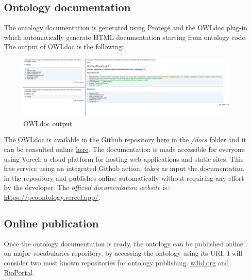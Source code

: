 \subsection{Ontology documentation}
The ontology documentation is generated using Protegé and the OWLdoc plug-in which automatically generate HTML documentation starting from ontology code. The output of OWLdoc is the following:
\begin{figure}[H]
    \centering
    \includegraphics[width=0.9\linewidth]{Figures/fig_63.png}
    \caption{OWLdoc output}
    \label{fig:enter-label}
\end{figure}
The OWLdoc is available in the Github repository \href{https://github.com/simonegramegna/peo/tree/main/docs}{here} in the \textit{/docs} folder and it can be consulted online \href{https://peoontology.vercel.app/}{here}. The documentation is made accessible for everyone using Vercel: a cloud platform for hosting web applications and static sites. This free service using an integrated Github action, takes as input the documentation in the repository and publishes online automatically without requiring any effort by the developer. The \textit{official documentation website} is:
\href{https://peoontology.vercel.app/}{https://peoontology.vercel.app/}.

\subsection{Online publication}
Once the ontology documentation is ready, the ontology can be published online on major vocabularies repository, by accessing the ontology using its URI. I will consider two most known repositories for ontology publishing: \href{https://w3id.org/}{w3id.org} and \href{https://bioportal.bioontology.org/}{BioPortal}.


